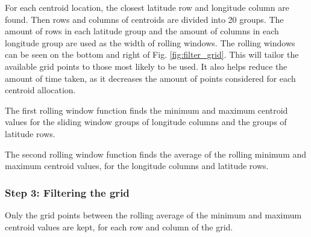 \documentclass[
]{jss}
\begin{document}
For each centroid location, the closest latitude row and longitude
column are found. Then rows and columns of centroids are divided into 20
groups. The amount of rows in each latitude group and the amount of
columns in each longitude group are used as the width of rolling
windows. The rolling windows can be seen on the bottom and right of Fig.
\ref{fig:filter_grid}. This will tailor the available grid points to
those most likely to be used. It also helps reduce the amount of time
taken, as it decreases the amount of points considered for each centroid
allocation.

The first rolling window function finds the minimum and maximum centroid
values for the sliding window groups of longitude columns and the groups
of latitude rows.

The second rolling window function finds the average of the rolling
minimum and maximum centroid values, for the longitude columns and
latitude rows.

\hypertarget{step-3-filtering-the-grid}{%
\subsubsection{Step 3: Filtering the
grid}\label{step-3-filtering-the-grid}}

Only the grid points between the rolling average of the minimum and
maximum centroid values are kept, for each row and column of the grid.
\end{document}
